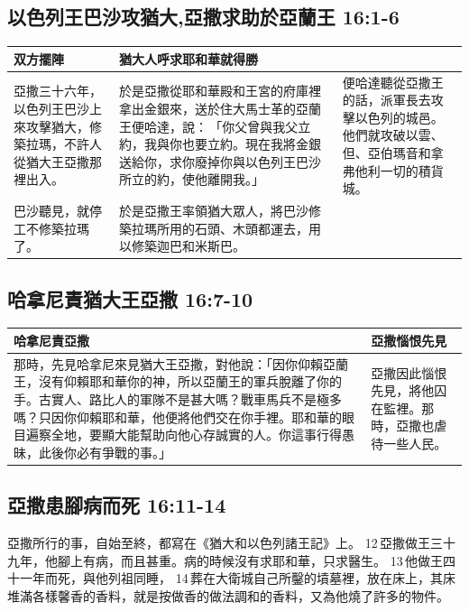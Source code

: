\subsection{以色列王巴沙攻猶大,亞撒求助於亞蘭王 16:1-6}
\begin{table}[H]
\centering 
\begin{tabular}{p{}|p{8.25cm}|p{4.75cm}}\hline\hline
双方擺陣&猶大人呼求耶和華就得勝&\\\hline\hline
亞撒三十六年，以色列王巴沙上來攻擊猶大，修築拉瑪，不許人從猶大王亞撒那裡出入。
&於是亞撒從耶和華殿和王宮的府庫裡拿出金銀來，送於住大馬士革的亞蘭王便哈達，說： 「你父曾與我父立約，我與你也要立約。現在我將金銀送給你，求你廢掉你與以色列王巴沙所立的約，使他離開我。」
&便哈達聽從亞撒王的話，派軍長去攻擊以色列的城邑。他們就攻破以雲、但、亞伯瑪音和拿弗他利一切的積貨城。
\\\hline
巴沙聽見，就停工不修築拉瑪了。&於是亞撒王率領猶大眾人，將巴沙修築拉瑪所用的石頭、木頭都運去，用以修築迦巴和米斯巴。&\\\hline
\end{tabular}
\end{table}


\subsection{哈拿尼責猶大王亞撒 16:7-10}
\begin{table}[H]
\centering 
\begin{tabular}{p{13.5cm}|p{}}\hline\hline
哈拿尼責亞撒&亞撒惱恨先見\\\hline\hline
那時，先見哈拿尼來見猶大王亞撒，對他說：「因你仰賴亞蘭王，沒有仰賴耶和華你的神，所以亞蘭王的軍兵脫離了你的手。古實人、路比人的軍隊不是甚大嗎？戰車馬兵不是極多嗎？只因你仰賴耶和華，他便將他們交在你手裡。耶和華的眼目遍察全地，要顯大能幫助向他心存誠實的人。你這事行得愚昧，此後你必有爭戰的事。」
&亞撒因此惱恨先見，將他囚在監裡。那時，亞撒也虐待一些人民。\\\hline
\end{tabular}
\end{table}


\subsection{亞撒患腳病而死 16:11-14}
亞撒所行的事，自始至終，都寫在《猶大和以色列諸王記》上。 12 亞撒做王三十九年，他腳上有病，而且甚重。病的時候沒有求耶和華，只求醫生。 13 他做王四十一年而死，與他列祖同睡， 14 葬在大衛城自己所鑿的墳墓裡，放在床上，其床堆滿各樣馨香的香料，就是按做香的做法調和的香料，又為他燒了許多的物件。

